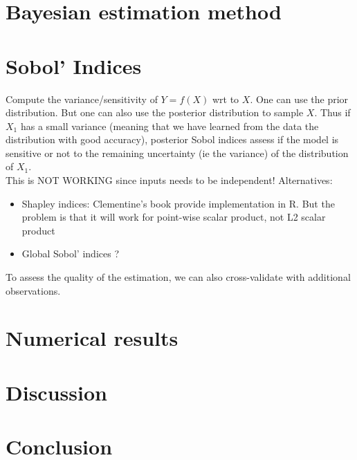 \documentclass[draft]{agujournal2019}
\newcommand{\blu}[1]{{\color{BlueGreen} #1}}
\begin{document}
\subsection{}




\section{Bayesian estimation method}

\section{Sobol' Indices}

Compute the variance/sensitivity of $Y=f(X)$ wrt to $X$. One can use the prior distribution. But one can also use the posterior distribution to sample $X$. Thus if $X_1$ has a small variance (meaning that we have learned from the data the distribution with good accuracy), posterior Sobol indices  assess if the model is sensitive or not to the remaining uncertainty (ie the variance) of the distribution of $X_1$. 
\\
\blu{This is NOT WORKING since inputs needs to be independent! }
Alternatives:
\begin{itemize}
    \item Shapley indices: Clementine's book provide implementation in R. But the problem is that it will work for point-wise scalar product, not L2 scalar product
    \item Global Sobol' indices ? 
\end{itemize}

To assess the quality of the estimation, we can also cross-validate with additional observations.

\section{Numerical results}

\section{Discussion}

\section{Conclusion}

%
\end{document}
